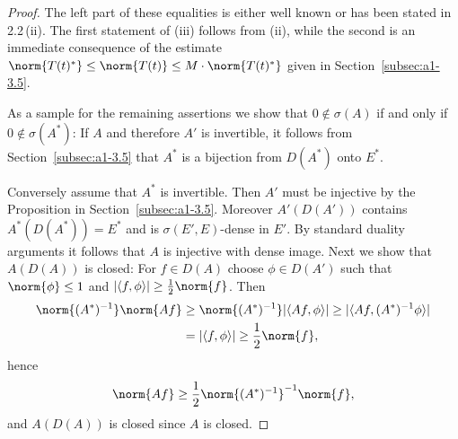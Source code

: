 \begin{proof}
The left part of these equalities is either well known or has been stated in 
2.2\,(ii).
The first statement of (iii) follows from (ii), while the second is an immediate consequence of the estimate $\norm{T(t)^{*}} \leq \norm{T(t)} \leq M\cdot\norm{T(t)^{*}}$ given in Section~\ref{subsec:a1-3.5}.

As a sample for the remaining assertions we show that $0 \notin \sigma(A)$ if and only if\/ $0 \notin \sigma(A^{*})$:
If\/ $A$ and therefore $A'$ is invertible, it follows from Section~\ref{subsec:a1-3.5} that $A^{*}$ is a bijection from $D(A^{*})$ onto $E^{*}$.

Conversely assume that $A^{*}$ is invertible.
Then $A'$ must be injective by the Proposition in Section~\ref{subsec:a1-3.5}.
Moreover $A'(D(A'))$ contains $A^{*}(D(A^{*})) = E^{*}$ and is $\sigma(E',E)$-dense in $E'$.
By standard duality arguments it follows that $A$ is injective with dense image.
Next we show that $A(D(A))$ is closed: For $f \in D(A)$ choose $\phi \in D(A')$ such that $\norm{\phi} \leq 1$ and $|\langle f,\phi \rangle| \geq \frac{1}{2}\norm{f}$.
Then
\begin{align*}
\norm{(A^{*})^{-1}} \norm{Af} &\geq \norm{(A^{*})^{-1}} |\langle Af,\phi \rangle| \geq |\langle Af,(A^{*})^{-1}\phi \rangle| \\
&= |\langle f,\phi \rangle| \geq \frac{1}{2}\norm{f} ,
\end{align*}
hence
\[
\norm{Af} \geq \frac{1}{2}\norm{(A^{*})^{-1}}^{-1}\norm{f} ,
\]
and $A(D(A))$ is closed since $A$ is closed.
\end{proof}
